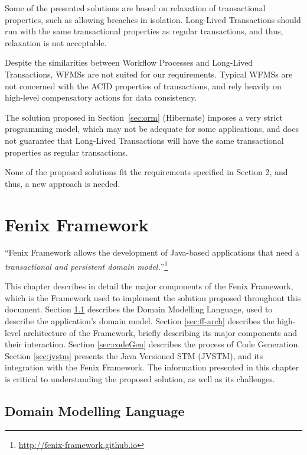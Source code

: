 \documentclass{llncs}
\begin{document}
Some of the presented solutions are based on relaxation of
transactional properties, such as allowing breaches in
isolation. Long-Lived Transactions should run with the same
transactional properties as regular transactions, and thus, relaxation
is not acceptable.

Despite the similarities between Workflow Processes and Long-Lived
Transactions, WFMSs are not suited for our requirements. Typical WFMSs
are not concerned with the ACID properties of transactions, and rely
heavily on high-level compensatory actions for data consistency.

The solution proposed in Section~\ref{sec:orm} (Hibernate) imposes a
very strict programming model, which may not be adequate for some
applications, and does not guarantee that Long-Lived Transactions will
have the same transactional properties as regular transactions.

None of the proposed solutions fit the requirements specified in
Section 2, and thus, a new approach is needed.


\section{Fenix Framework}
\label{chap:ff}

``Fenix Framework allows the development of Java-based applications
that need a {\it transactional and persistent domain
  model.}''\footnote{\url{http://fenix-framework.github.io}}

This chapter describes in detail the major components of the Fenix
Framework, which is the Framework used to implement the solution
proposed throughout this document. Section \ref{sec:dml} describes the
Domain Modelling Language, used to describe the application's domain
model. Section \ref{sec:ff-arch} describes the high-level architecture
of the Framework, briefly describing its major components and their
interaction. Section \ref{sec:codeGen} describes the process of Code
Generation. Section \ref{sec:jvstm} presents the Java Versioned STM
(JVSTM), and its integration with the Fenix Framework. The information
presented in this chapter is critical to understanding the proposed
solution, as well as its challenges.

\subsection{Domain Modelling Language}
\label{sec:dml}
\end{document}
